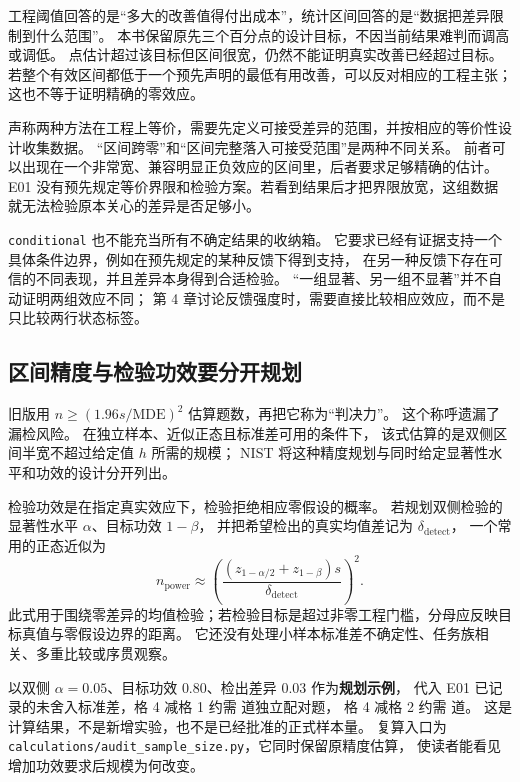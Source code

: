 工程阈值回答的是“多大的改善值得付出成本”，统计区间回答的是“数据把差异限制到什么范围”。
本书保留原先三个百分点的设计目标，不因当前结果难判而调高或调低。
点估计超过该目标但区间很宽，仍然不能证明真实改善已经超过目标。
若整个有效区间都低于一个预先声明的最低有用改善，可以反对相应的工程主张；
这也不等于证明精确的零效应。

声称两种方法在工程上等价，需要先定义可接受差异的范围，并按相应的等价性设计收集数据。
“区间跨零”和“区间完整落入可接受范围”是两种不同关系。
前者可以出现在一个非常宽、兼容明显正负效应的区间里，后者要求足够精确的估计。
E01 没有预先规定等价界限和检验方案。若看到结果后才把界限放宽，这组数据就无法检验原本关心的差异是否足够小。

\texttt{conditional} 也不能充当所有不确定结果的收纳箱。
它要求已经有证据支持一个具体条件边界，例如在预先规定的某种反馈下得到支持，
在另一种反馈下存在可信的不同表现，并且差异本身得到合适检验。
“一组显著、另一组不显著”并不自动证明两组效应不同；
第 4 章讨论反馈强度时，需要直接比较相应效应，而不是只比较两行状态标签。

\subsection{区间精度与检验功效要分开规划}

旧版用 $n\ge(1.96s/\mathrm{MDE})^2$ 估算题数，再把它称为“判决力”。
这个称呼遗漏了漏检风险。
在独立样本、近似正态且标准差可用的条件下，
该式估算的是双侧区间半宽不超过给定值 $h$ 所需的规模；
NIST 将这种精度规划与同时给定显著性水平和功效的设计分开列出\cite{nist-sample-size}。

检验功效是在指定真实效应下，检验拒绝相应零假设的概率。
若规划双侧检验的显著性水平 $\alpha$、目标功效 $1-\beta$，
并把希望检出的真实均值差记为 $\delta_{\mathrm{detect}}$，
一个常用的正态近似为
\begin{equation}
 n_{\mathrm{power}}\approx
 \left(\frac{(z_{1-\alpha/2}+z_{1-\beta})s}
 {\delta_{\mathrm{detect}}}\right)^2.
 \label{eq:ch03-power}
\end{equation}
此式用于围绕零差异的均值检验；若检验目标是超过非零工程门槛，分母应反映目标真值与零假设边界的距离。
它还没有处理小样本标准差不确定性、任务族相关、多重比较或序贯观察。

以双侧 $\alpha=0.05$、目标功效 $0.80$、检出差异 $0.03$ 作为\textbf{规划示例}，
代入 E01 已记录的未舍入标准差，格 4 减格 1 约需  道独立配对题，
格 4 减格 2 约需  道。
这是计算结果，不是新增实验，也不是已经批准的正式样本量。
复算入口为 \texttt{calculations/audit\_sample\_size.py}，它同时保留原精度估算，
使读者能看见增加功效要求后规模为何改变。


